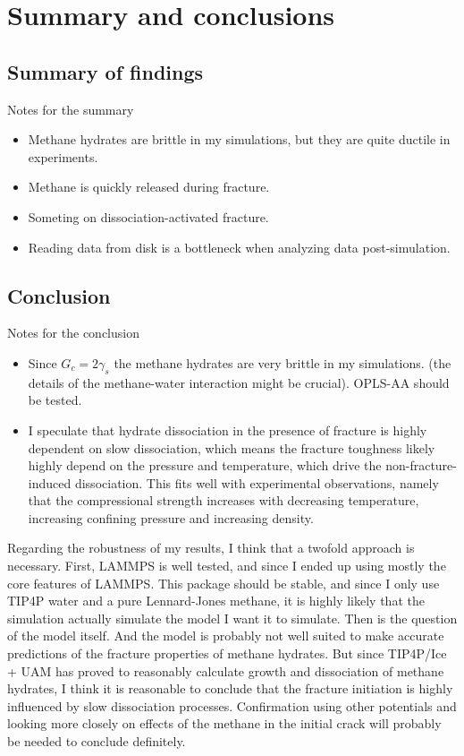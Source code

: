 \chapter{Summary and conclusions}
\label{ch:summary_conclusions}
\section{Summary of findings}
Notes for the summary
\begin{itemize}
\item Methane hydrates are brittle in my simulations, but they are quite ductile in experiments.
\item Methane is quickly released during fracture.
\item Someting on dissociation-activated fracture.
\item Reading data from disk is a bottleneck when analyzing data post-simulation. 
\end{itemize}

\section{Conclusion}
Notes for the conclusion
\begin{itemize}
\item Since $G_c = 2\gamma_s$ the methane hydrates are very brittle in my simulations. (the details of the methane-water interaction might be crucial). OPLS-AA should be tested.
\item I speculate that hydrate dissociation in the presence of fracture is highly dependent on slow dissociation, which means the fracture toughness likely highly depend on the pressure and temperature, which drive the non-fracture-induced dissociation. This fits well with experimental observations, namely that the compressional strength increases with decreasing temperature, increasing confining pressure and increasing density.
\end{itemize}

Regarding the robustness of my results, I think that a twofold approach is necessary. First, LAMMPS is well tested, and since I ended up using mostly the core features of LAMMPS. This package should be stable, and since I only use TIP4P water and a pure Lennard-Jones methane, it is highly likely that the simulation actually simulate the model I want it to simulate. Then is the question of the model itself. And the model is probably not well suited to make accurate predictions of the fracture properties of methane hydrates. But since TIP4P/Ice + UAM has proved to reasonably calculate growth and dissociation of methane hydrates, I think it is reasonable to conclude that the fracture initiation is highly influenced by slow dissociation processes. Confirmation using other potentials and looking more closely on effects of the methane in the initial crack will probably be needed to conclude definitely.

